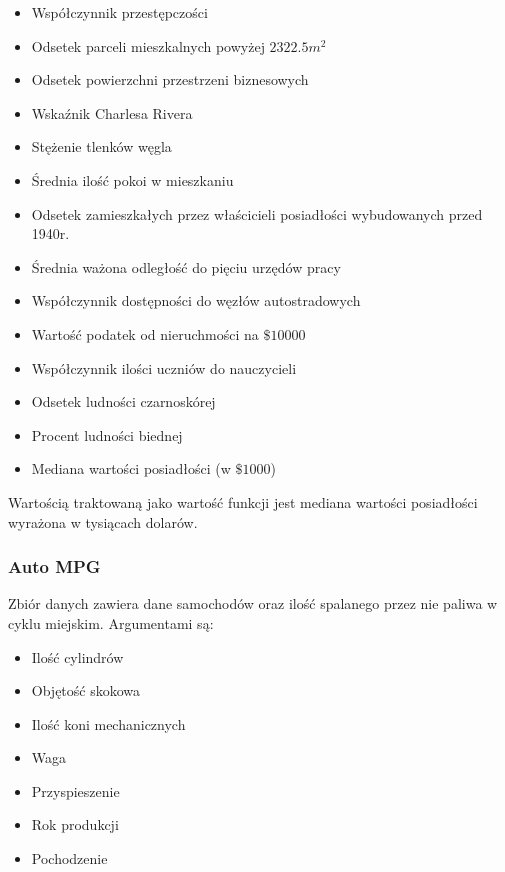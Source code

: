 \documentclass[a4paper; 11pt]{article}
\begin{document}
\begin{itemize}
\item Współczynnik przestępczości
\item Odsetek parceli mieszkalnych powyżej $2322.5m^2$
\item Odsetek powierzchni przestrzeni biznesowych
\item Wskaźnik Charlesa Rivera
\item Stężenie tlenków węgla
\item Średnia ilość pokoi w mieszkaniu
\item Odsetek zamieszkałych przez właścicieli posiadłości wybudowanych przed 1940r.
\item Średnia ważona odległość do pięciu urzędów pracy
\item Współczynnik dostępności do węzłów autostradowych
\item Wartość podatek od nieruchmości na $\$10000$
\item Współczynnik ilości uczniów do nauczycieli
\item Odsetek ludności czarnoskórej
\item Procent ludności biednej
\item Mediana wartości posiadłości (w $\$1000$)
\end{itemize}

Wartością traktowaną jako wartość funkcji jest mediana wartości posiadłości wyrażona w tysiącach dolarów.

\subsubsection{Auto MPG}
Zbiór danych zawiera dane samochodów oraz ilość spalanego przez nie paliwa w cyklu miejskim. Argumentami są:

\begin{itemize}
\item Ilość cylindrów
\item Objętość skokowa
\item Ilość koni mechanicznych
\item Waga
\item Przyspieszenie
\item Rok produkcji
\item Pochodzenie
\end{itemize}
\end{document}
